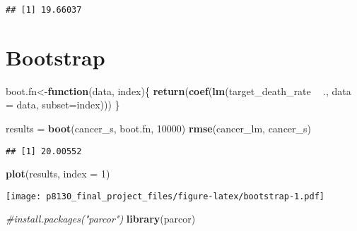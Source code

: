 \documentclass[]{article}
\newenvironment{Shaded}{\begin{snugshade}}{\end{snugshade}}
\newcommand{\KeywordTok}[1]{\textcolor[rgb]{0.13,0.29,0.53}{\textbf{#1}}}
\newcommand{\DataTypeTok}[1]{\textcolor[rgb]{0.13,0.29,0.53}{#1}}
\newcommand{\DecValTok}[1]{\textcolor[rgb]{0.00,0.00,0.81}{#1}}
\newcommand{\StringTok}[1]{\textcolor[rgb]{0.31,0.60,0.02}{#1}}
\newcommand{\CommentTok}[1]{\textcolor[rgb]{0.56,0.35,0.01}{\textit{#1}}}
\newcommand{\ControlFlowTok}[1]{\textcolor[rgb]{0.13,0.29,0.53}{\textbf{#1}}}
\newcommand{\OperatorTok}[1]{\textcolor[rgb]{0.81,0.36,0.00}{\textbf{#1}}}
\newcommand{\NormalTok}[1]{#1}
\begin{document}
\begin{verbatim}
## [1] 19.66037
\end{verbatim}

\section{Bootstrap}\label{bootstrap}

\begin{Shaded}
\begin{Highlighting}[]
\NormalTok{boot.fn<-}\ControlFlowTok{function}\NormalTok{(data, index)\{}
    \KeywordTok{return}\NormalTok{(}\KeywordTok{coef}\NormalTok{(}\KeywordTok{lm}\NormalTok{(target_death_rate }\OperatorTok{~}\StringTok{ }\NormalTok{., }\DataTypeTok{data =}\NormalTok{ data, }\DataTypeTok{subset=}\NormalTok{index)))}
\NormalTok{\}}

\NormalTok{results =}\StringTok{ }\KeywordTok{boot}\NormalTok{(cancer_s, boot.fn, }\DecValTok{10000}\NormalTok{)}
\KeywordTok{rmse}\NormalTok{(cancer_lm, cancer_s)}
\end{Highlighting}
\end{Shaded}

\begin{verbatim}
## [1] 20.00552
\end{verbatim}

\begin{Shaded}
\begin{Highlighting}[]
\KeywordTok{plot}\NormalTok{(results, }\DataTypeTok{index =} \DecValTok{1}\NormalTok{)}
\end{Highlighting}
\end{Shaded}

\texttt{[image: p8130\_final\_project\_files/figure-latex/bootstrap-1.pdf]}

\begin{Shaded}
\end{Shaded}

\begin{Shaded}
\begin{Highlighting}[]
\CommentTok{#install.packages("parcor")}
\KeywordTok{library}\NormalTok{(parcor)}
\end{Highlighting}
\end{Shaded}
\end{document}
